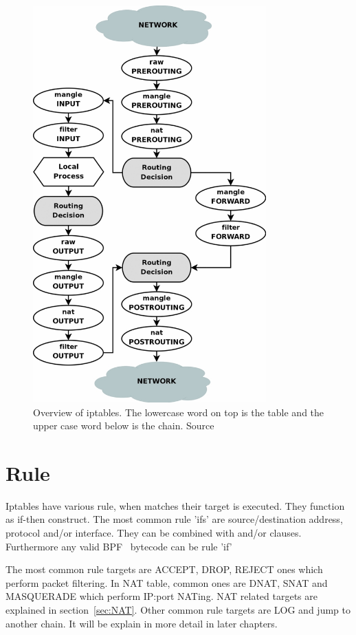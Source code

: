 \documentclass[times, utf8, seminar, english]{fer}
\begin{document}
\begin{figure}
    \centering
    \includegraphics[width=0.8\textwidth]{tables_traverse}
    \caption{Overview of iptables. The lowercase word on top is the table and the upper case word below is the chain. Source~\cite{Iptables99:online}}
    \label{fig:iptables_traverse}
\end{figure}

\section{Rule}
    Iptables have various rule, when matches their target is executed. They function as if-then construct. The most common rule 'ifs' are source/destination address, protocol and/or interface. They can be combined with and/or clauses. Furthermore any valid BPF~\cite{BPFthefo6:online} bytecode can be rule 'if'

    The most common rule targets are ACCEPT, DROP, REJECT ones which perform packet filtering. In NAT table, common ones are DNAT, SNAT and MASQUERADE which perform IP:port NATing. NAT related targets are explained in section~\ref{sec:NAT}. Other common rule targets are LOG and jump to another chain. It will be explain in more detail in later chapters.
\end{document}
